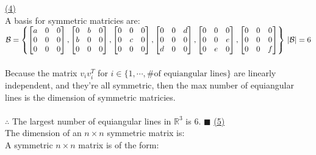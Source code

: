 \documentclass[12pt]{article}
\newcommand{\R}{\mathbb{R}}
\renewcommand{\qed}{\hfill$\blacksquare$}
\begin{document}
	\hyperlink{toc}{\hypertarget{5.4}{(4)}}\\
	A basis for symmetric matricies are:\\
$\mathcal{B} = \displaystyle \left\{\begin{bmatrix}
	a & 0 & 0 \\
	0 & 0 & 0 \\
	0 & 0 & 0 \\
\end{bmatrix},
\begin{bmatrix}
	0 & b & 0 \\
	b & 0 & 0 \\
	0 & 0 & 0 \\
\end{bmatrix},
\begin{bmatrix}
	0 & 0 & 0 \\
	0 & c & 0 \\
	0 & 0 & 0 \\
\end{bmatrix},
\begin{bmatrix}
	0 & 0 & d \\
	0 & 0 & 0 \\
	d & 0 & 0 \\
\end{bmatrix},
\begin{bmatrix}
	0 & 0 & 0 \\
	0 & 0 & e \\
	0 & e & 0 \\
\end{bmatrix},
\begin{bmatrix}
	0 & 0 & 0 \\
	0 & 0 & 0 \\
	0 & 0 & f \\
\end{bmatrix}\right\}\\
\left|\mathcal{B}\right| = 6$
	\\\\
	Because the matrix $v_i v_i^T$ for $i \in \{1, \cdots, \text{\#of equiangular lines}\}$ are linearly independent, and they're all symmetric, then the max number of equiangular lines is the dimension of symmetric matricies.
	\\\\
$\therefore$ The largest number of equiangular lines in $\R^3$ is 6. \qed
	\newpage
	\hyperlink{toc}{\hypertarget{5.5}{(5)}}\\
	The dimension of an $n\times n$ symmetric matrix is:\\
	A symmetric $n\times n$ matrix is of the form:\\
\end{document}
